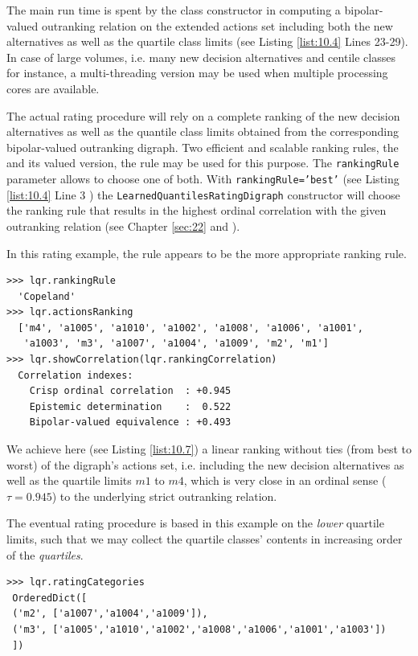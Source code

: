 The main run time is spent by the class constructor in computing a bipolar-valued outranking relation on the extended actions set including both the new alternatives as well as the quartile class limits (see Listing \ref{list:10.4} Lines 23-29). In case of large volumes, i.e. many new decision alternatives and centile classes for instance, a multi-threading version may be used when multiple processing cores are available.

The actual rating procedure will rely on a complete ranking of the new decision alternatives as well as the quantile class limits obtained from the corresponding bipolar-valued outranking digraph. Two efficient and scalable ranking rules, the \Copeland and its valued version, the \NetFlows rule may be used for this purpose. The \texttt{rankingRule} parameter allows to choose one of both. With \texttt{rankingRule='best'} (see Listing \ref{list:10.4} Line 3 ) the \texttt{LearnedQuantilesRatingDigraph} constructor will choose the ranking rule that results in the highest ordinal correlation with the given outranking relation (see Chapter \ref{sec:22} and \citep{BIS-2012a}).

In this rating example, the \Copeland rule appears to be the more appropriate ranking rule.

\begin{lstlisting}[caption={\Copeland ranking of new alternatives and historical quartile limits},label=list:10.7]
>>> lqr.rankingRule
  'Copeland'
>>> lqr.actionsRanking
  ['m4', 'a1005', 'a1010', 'a1002', 'a1008', 'a1006', 'a1001',
   'a1003', 'm3', 'a1007', 'a1004', 'a1009', 'm2', 'm1'] 
>>> lqr.showCorrelation(lqr.rankingCorrelation)
  Correlation indexes:
    Crisp ordinal correlation  : +0.945
    Epistemic determination    :  0.522
    Bipolar-valued equivalence : +0.493
\end{lstlisting}

We achieve here (see Listing \ref{list:10.7}) a linear ranking without ties (from best to worst) of the digraph's actions set, i.e. including the new decision alternatives as well as the quartile limits $m1$ to $m4$, which is very close in an ordinal sense ($\tau = 0.945$) to the underlying strict outranking relation.

The eventual rating procedure is based in this example on the \emph{lower} quartile limits, such that we may collect the quartile classes' contents in increasing order of the \emph{quartiles}.

\begin{lstlisting}
>>> lqr.ratingCategories
 OrderedDict([
 ('m2', ['a1007','a1004','a1009']),
 ('m3', ['a1005','a1010','a1002','a1008','a1006','a1001','a1003'])
 ])
\end{lstlisting}    

